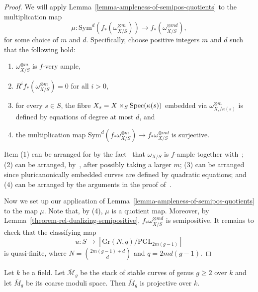 \begin{proof}
We will apply Lemma~\ref{lemma-ampleness-of-semipos-quotients} to the
multiplication map
$$
\mu : \mathrm{Sym}^d(f_*(\omega_{X/S}^{\otimes m})) \to f_*(\omega_{X/S}^{\otimes md}),
$$
for some choice of $m$ and $d$.
Specifically, choose positive integers $m$ and $d$ such that the following
hold:
\begin{enumerate}
\item $\omega_{X/S}^{\otimes m}$ is $f$-very ample,
\item $R^if_*(\omega_{X/S}^{\otimes m}) = 0$ for all $i > 0$,
\item for every $s \in S$, the fibre $X_s = X \times_S \mathop{\rm Spec}(\kappa(s))$
  embedded via $\omega_{X_s/\kappa(s)}^{\otimes m}$ is defined by equations
  of degree at most $d$, and
\item the multiplication map
  $\mathrm{Sym}^d(f_*\omega_{X/S}^{\otimes m}) \to f_*\omega_{X/S}^{\otimes md}$
  is surjective.
\end{enumerate}
Item (1) can be arranged for by the fact~\cite[Corollary of (1.2)]{dm} that
$\omega_{X/S}$ is $f$-ample together with~;
(2) can be arranged, by~, after possibly taking a larger $m$;
(3) can be arranged since pluricanonically embedded curves are defined
by quadratic equations; and
(4) can be arranged by the arguments in the proof of~.

Now we set up our application of Lemma~\ref{lemma-ampleness-of-semipos-quotients}
to the map $\mu$.
Note that, by (4), $\mu$ is a quotient map.
Moreover, by Lemma~\ref{theorem-rel-dualizing-semipositive},
$f_*\omega_{X/S}^{\otimes md}$ is semipositive.
It remains to check that the classifying map
$$
u : S \to [\mathrm{Gr}(N,q)/\mathrm{PGL}_{2m(g - 1)}]
$$
is quasi-finite, where $N = \binom{2m(g - 1) + d}{d}$ and $q = 2md(g - 1)$.
\end{proof}

\begin{lemma}
\label{lemma-mgbar-proj-field}
Let $k$ be a field.
Let $\overline{\mathcal{M}}_g$ be the stack of stable curves of genus $g \geq 2$
over $k$ and let $\overline{M}_g$ be its coarse moduli space.
Then $\overline{M}_g$ is projective over $k$.
\end{lemma}

